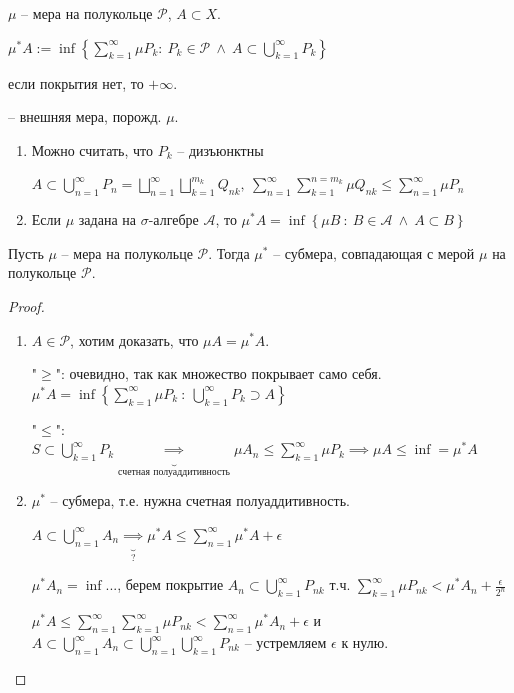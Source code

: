 \begin{definition}
    $\mu$ -- мера на полукольце $\mathcal{P}$, $A \subset X$.

    $\mu^* A := \inf{ \left\{\sum_{k=1}^{\infty} \mu P_k: \ P_k \in \mathcal{P} \ \land \ A \subset \bigcup_{k=1}^{\infty} P_k \right\}}$

    если покрытия нет, то $+\infty$.

    -- внешняя мера, порожд. $\mu$.
\end{definition}
\begin{remark}
    \begin{enumerate}
        \item {
            Можно считать, что $P_k$ -- дизъюнктны

            $A \subset \bigcup_{n=1}^{\infty} P_n = \bigsqcup_{n=1}^{\infty} \bigsqcup_{k=1}^{m_k} Q_{nk}, \ \sum_{n=1}^{\infty} \sum_{k=1}^{n=m_k} \mu Q_{nk} \leq \sum_{n=1}^{\infty} \mu P_n$
        }
        \item {
            Если $\mu$ задана на $\sigma$-алгебре $\mathcal{A}$, то $\mu^* A = \inf \left\{\mu B \ : \ B \in \mathcal{A} \ \land \ A \subset B \right\}$
        }
    \end{enumerate}
\end{remark}


\begin{theorem}
    Пусть $\mu$ -- мера на полукольце $\mathcal{P}$. Тогда $\mu^*$ -- субмера, совпадающая с мерой $\mu$ на полукольце $\mathcal{P}$.
\end{theorem}
\begin{proof}
    \begin{enumerate}
        \item {
            $A \in \mathcal{P}$, хотим доказать, что $\mu A = \mu^* A$.

            "$\geq$": очевидно, так как множество покрывает само себя. $\mu^* A = \inf\left\{ \sum_{k=1}^{\infty} \mu P_k \ : \ \bigcup_{k=1}^{\infty} P_k \supset A \right\}$

            "$\leq$": $S \subset \bigcup_{k=1}^{\infty} P_k \underbrace{\implies}_{\text{счетная полуаддитивность}} \mu A_n \leq \sum_{k=1}^{\infty} \mu P_k \implies \mu A \leq \inf = \mu^* A$
        }
        \item {
            $\mu^*$ -- субмера, т.е. нужна счетная полуаддитивность.

            $A \subset \bigcup_{n=1}^{\infty} A_n \underbrace{\implies}_{?} \mu^* A \leq \sum_{n=1}^{\infty} \mu^* A + \epsilon$

            $\mu^* A_n = \inf ... $, берем покрытие $A_n \subset \bigcup_{k=1}^{\infty} P_{nk}$ т.ч. $\sum_{k=1}^{\infty} \mu P_{nk} < \mu^* A_n + \frac{\epsilon}{2^n}$

            $\mu^* A \leq \sum_{n=1}^{\infty} \sum_{k=1}^{\infty} \mu P_{nk} < \sum_{n=1}^{\infty} \mu^* A_n + \epsilon$ и $A \subset \bigcup_{n=1}^{\infty} A_n \subset \bigcup_{n=1}^{\infty} \bigcup_{k=1}^{\infty} P_{nk}$ -- устремляем $\epsilon$ к нулю.

        }
    \end{enumerate}
\end{proof}

